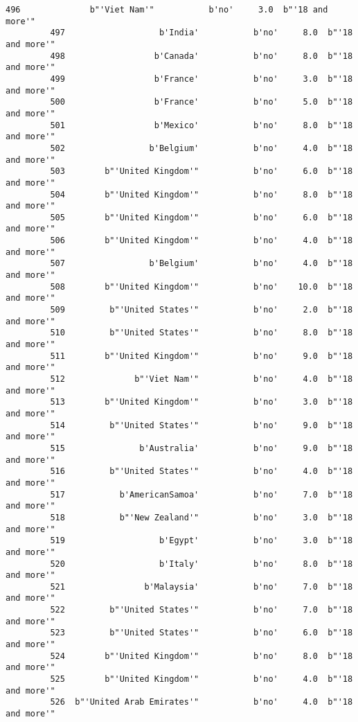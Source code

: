 \documentclass[11pt]{article}
\begin{document}
\begin{Verbatim}[commandchars=\\\{\}]
         496              b"'Viet Nam'"           b'no'     3.0  b"'18 and more'"   
         497                   b'India'           b'no'     8.0  b"'18 and more'"   
         498                  b'Canada'           b'no'     8.0  b"'18 and more'"   
         499                  b'France'           b'no'     3.0  b"'18 and more'"   
         500                  b'France'           b'no'     5.0  b"'18 and more'"   
         501                  b'Mexico'           b'no'     8.0  b"'18 and more'"   
         502                 b'Belgium'           b'no'     4.0  b"'18 and more'"   
         503        b"'United Kingdom'"           b'no'     6.0  b"'18 and more'"   
         504        b"'United Kingdom'"           b'no'     8.0  b"'18 and more'"   
         505        b"'United Kingdom'"           b'no'     6.0  b"'18 and more'"   
         506        b"'United Kingdom'"           b'no'     4.0  b"'18 and more'"   
         507                 b'Belgium'           b'no'     4.0  b"'18 and more'"   
         508        b"'United Kingdom'"           b'no'    10.0  b"'18 and more'"   
         509         b"'United States'"           b'no'     2.0  b"'18 and more'"   
         510         b"'United States'"           b'no'     8.0  b"'18 and more'"   
         511        b"'United Kingdom'"           b'no'     9.0  b"'18 and more'"   
         512              b"'Viet Nam'"           b'no'     4.0  b"'18 and more'"   
         513        b"'United Kingdom'"           b'no'     3.0  b"'18 and more'"   
         514         b"'United States'"           b'no'     9.0  b"'18 and more'"   
         515               b'Australia'           b'no'     9.0  b"'18 and more'"   
         516         b"'United States'"           b'no'     4.0  b"'18 and more'"   
         517           b'AmericanSamoa'           b'no'     7.0  b"'18 and more'"   
         518           b"'New Zealand'"           b'no'     3.0  b"'18 and more'"   
         519                   b'Egypt'           b'no'     3.0  b"'18 and more'"   
         520                   b'Italy'           b'no'     8.0  b"'18 and more'"   
         521                b'Malaysia'           b'no'     7.0  b"'18 and more'"   
         522         b"'United States'"           b'no'     7.0  b"'18 and more'"   
         523         b"'United States'"           b'no'     6.0  b"'18 and more'"   
         524        b"'United Kingdom'"           b'no'     8.0  b"'18 and more'"   
         525        b"'United Kingdom'"           b'no'     4.0  b"'18 and more'"   
         526  b"'United Arab Emirates'"           b'no'     4.0  b"'18 and more'"   

\end{Verbatim}
\end{document}
